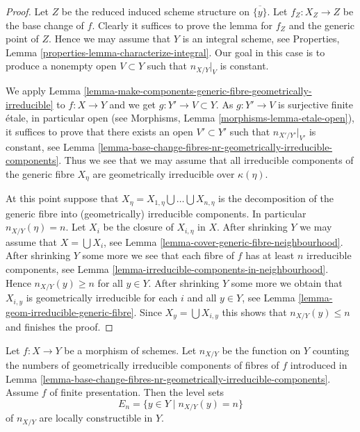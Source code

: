 \begin{proof}
Let $Z$ be the reduced induced scheme structure on $\overline{\{y\}}$.
Let $f_Z : X_Z \to Z$ be the base change of $f$. Clearly it suffices to prove
the lemma for $f_Z$ and the generic point of $Z$. Hence we may assume that
$Y$ is an integral scheme, see
Properties, Lemma \ref{properties-lemma-characterize-integral}.
Our goal in this case is to produce a nonempty open $V \subset Y$ such that
$n_{X/Y}|_V$ is constant.

\medskip\noindent
We apply
Lemma \ref{lemma-make-components-generic-fibre-geometrically-irreducible}
to $f : X \to Y$ and we get $g : Y' \to V \subset Y$. As $g : Y' \to V$ is
surjective finite \'etale, in particular open (see
Morphisms, Lemma \ref{morphisms-lemma-etale-open}),
it suffices to prove that there exists an open $V' \subset Y'$
such that $n_{X'/Y'}|_{V'}$ is constant, see
Lemma \ref{lemma-base-change-fibres-nr-geometrically-irreducible-components}.
Thus we see that we may assume that all irreducible components of
the generic fibre $X_\eta$ are geometrically irreducible over $\kappa(\eta)$.

\medskip\noindent
At this point suppose that
$X_\eta = X_{1, \eta} \bigcup \ldots \bigcup X_{n, \eta}$
is the decomposition of the generic fibre into
(geometrically) irreducible components.
In particular $n_{X/Y}(\eta) = n$.
Let $X_i$ be the closure of
$X_{i, \eta}$ in $X$. After shrinking $Y$ we may assume that
$X = \bigcup X_i$, see
Lemma \ref{lemma-cover-generic-fibre-neighbourhood}.
After shrinking $Y$ some more we see that each fibre of
$f$ has at least $n$ irreducible components, see
Lemma \ref{lemma-irreducible-components-in-neighbourhood}.
Hence $n_{X/Y}(y) \geq n$ for all $y \in Y$.
After shrinking $Y$ some more we obtain that $X_{i, y}$
is geometrically irreducible for each $i$ and all $y \in Y$, see
Lemma \ref{lemma-geom-irreducible-generic-fibre}.
Since $X_y = \bigcup X_{i, y}$
this shows that $n_{X/Y}(y) \leq n$ and finishes the proof.
\end{proof}

\begin{lemma}
\label{lemma-nr-geom-irreducible-components-constructible}
Let $f : X \to Y$ be a morphism of schemes. Let
$n_{X/Y}$ be the function on $Y$ counting the numbers of geometrically
irreducible components of fibres of $f$ introduced in
Lemma \ref{lemma-base-change-fibres-nr-geometrically-irreducible-components}.
Assume $f$ of finite presentation. Then the level sets
$$
E_n = \{y \in Y \mid n_{X/Y}(y) = n\}
$$
of $n_{X/Y}$ are locally constructible in $Y$.
\end{lemma}

